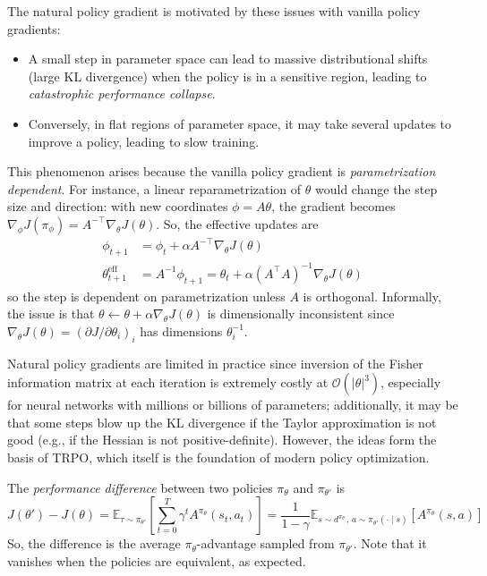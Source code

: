 \documentclass[11pt, letterpaper]{article}
\begin{document}
\begin{remark}
    The natural policy gradient is motivated by these issues with vanilla policy gradients: 
    \begin{itemize}
        \item A small step in parameter space can lead to massive distributional shifts (large KL divergence) when the policy is in a sensitive region, leading to \textit{catastrophic performance collapse}. 
        \item Conversely, in flat regions of parameter space, it may take several updates to improve a policy, leading to slow training. 
    \end{itemize}
    This phenomenon arises because the vanilla policy gradient is \textit{parametrization dependent}. For instance, a linear reparametrization of \(\theta\) would change the step size and direction: with new coordinates \(\phi = A\theta\), the gradient becomes \(\nabla_\phi J(\pi_\phi) = A^{-\top} \nabla_\theta J(\theta)\). So, the effective updates are
    \begin{align*}
        \phi_{t+1} &= \phi_t + \alpha A^{-\top} \nabla_\theta J(\theta) \\
        \theta_{t+1}^{\text{eff}} &= A^{-1} \phi_{t+1} = \theta_t + \alpha (A^\top A)^{-1} \nabla_\theta J(\theta)
    \end{align*}
    so the step is dependent on parametrization unless \(A\) is orthogonal. Informally, the issue is that \(\theta \leftarrow \theta + \alpha \nabla_\theta J(\theta)\) is dimensionally inconsistent since \(\nabla_\theta J(\theta) = (\partial J / \partial \theta_i)_i\) has dimensions \(\theta_i^{-1}\). 

    Natural policy gradients are limited in practice since inversion of the Fisher information matrix at each iteration is extremely costly at \(\mathcal{O}(|\theta|^3)\), especially for neural networks with millions or billions of parameters; additionally, it may be that some steps blow up the KL divergence if the Taylor approximation is not good (e.g., if the Hessian is not positive-definite). However, the ideas form the basis of TRPO, which itself is the foundation of modern policy optimization. 
\end{remark}

\begin{concept}
    The \textit{performance difference} between two policies \(\pi_\theta\) and \(\pi_{\theta'}\) is
    \[
        J(\theta') - J(\theta) 
        = \mathbb{E}_{\tau \sim \pi_{\theta'}}\left[ \sum_{t=0}^T \gamma^t A^{\pi_\theta}(s_t, a_t) \right]
        = \frac{1}{1 - \gamma} \mathbb{E}_{s \sim d^{\pi_{\theta'}},\, a \sim \pi_{\theta'}(\cdot \mid s)}[ A^{\pi_\theta}(s, a)]
    \]
    So, the difference is the average \(\pi_\theta\)-advantage sampled from \(\pi_{\theta'}\). Note that it vanishes when the policies are equivalent, as expected. 
\end{concept}
\end{document}
